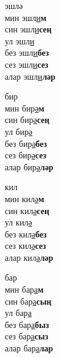 \begin{multicols}{4}
\begin{enumerate}
\begin{minipage}{\linewidth}
    \item
    эшлә\\
    мин эшл\underline{и}\textbf{м}\\
    син эшл\underline{и}\textbf{сең}\\
    ул эшл\underline{и}\\
    без эшл\underline{и}\textbf{без}\\
    сез эшл\underline{и}\textbf{сез}\\
    алар эшл\underline{и}\textbf{ләр}\\
\end{minipage}

\begin{minipage}{\linewidth}
    \item
    бир\\
    мин бир\underline{ә}\textbf{м}\\
    син бир\underline{ә}\textbf{сең}\\
    ул бир\underline{ә}\\
    без бир\underline{ә}\textbf{без}\\
    сез бир\underline{ә}\textbf{сез}\\
    алар бир\underline{ә}\textbf{ләр}\\
\end{minipage}

\begin{minipage}{\linewidth}
    \item
    кил\\
    мин кил\underline{ә}\textbf{м}\\
    син кил\underline{ә}\textbf{сең}\\
    ул кил\underline{ә}\\
    без кил\underline{ә}\textbf{без}\\
    сез кил\underline{ә}\textbf{сез}\\
    алар кил\underline{ә}\textbf{ләр}\\
\end{minipage}

\begin{minipage}{\linewidth}
    \item
    бар\\
    мин бар\underline{а}\textbf{м}\\
    син бар\underline{а}\textbf{сың}\\
    ул бар\underline{а}\\
    без бар\underline{а}\textbf{быз}\\
    сез бар\underline{а}\textbf{сыз}\\
    алар бар\underline{а}\textbf{лар}\\
\end{minipage}


\end{enumerate}
\end{multicols}

